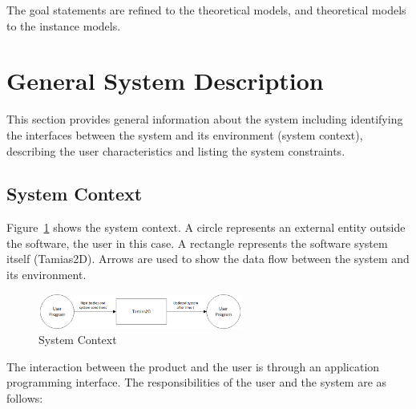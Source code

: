 \documentclass[12pt]{article}
\newcommand{\progname}{Tamias2D}
\begin{document}
The goal statements are refined to the theoretical models, and theoretical
models to the instance models.  

\section{General System Description}

This section provides general information about the system including identifying
the interfaces between the system and its environment (system context), describing
the user characteristics and listing the system constraints.

\subsection{System Context}
Figure~\ref{Fig_SystemContext} shows the system context. A circle represents an
external entity outside the software, the user in this case. A rectangle
represents the software system itself (\progname{}). Arrows are used to show the data
flow between the system and its environment.

\begin{figure}[h!]
  \begin{center}
    \includegraphics[width=0.6\textwidth]{SysCtxV2.png} 
    \caption{System Context}
    \label{Fig_SystemContext}
  \end{center}
\end{figure}

The interaction between the product and the user is through an application programming interface. The responsibilities of the user and the system are as follows:
\end{document}
